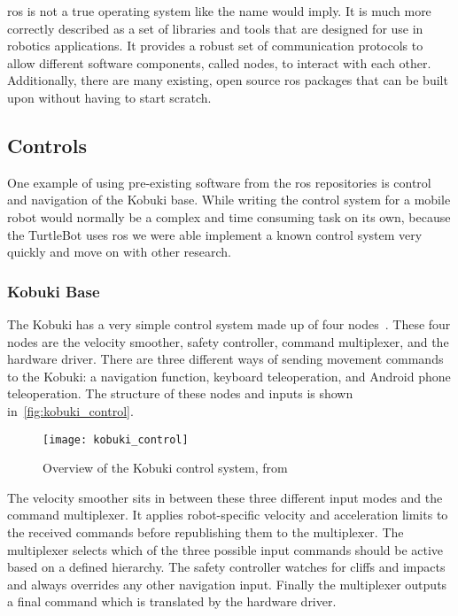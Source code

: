 \documentclass[thesis.tex]{subfile}
\begin{document}
\gls{ros} is not a true operating system like the name would imply. It is much more correctly described as a set of libraries and tools that are designed for use in robotics applications. It provides a robust set of communication protocols to allow different software components, called \glspl{node}, to interact with each other. Additionally, there are many existing, open source \gls{ros} packages that can be built upon without having to start scratch.

\subsection{Controls} \label{sec:controls}
One example of using pre-existing software from the \gls{ros} repositories is control and navigation of the Kobuki base. While writing the control system for a mobile robot would normally be a complex and time consuming task on its own, because the TurtleBot uses \gls{ros} we were able implement a known control system very quickly and move on with other research.

\subsubsection{Kobuki Base}
The Kobuki has a very simple control system made up of four \glspl{node}~\cite{KobukiControl}. These four \glspl{node} are the velocity smoother, safety controller, command multiplexer, and the hardware driver. There are three different ways of sending movement commands to the Kobuki: a navigation function, keyboard teleoperation, and Android phone teleoperation. The structure of these nodes and inputs is shown in~\autoref{fig:kobuki_control}.

\begin{figure}
\texttt{[image: kobuki\_control]}
\caption[Overview of the Kobuki control system]{Overview of the Kobuki control system, from~\cite{KobukiControl}}
\label{fig:kobuki_control}
\end{figure}

The velocity smoother sits in between these three different input modes and the command multiplexer. It applies robot-specific velocity and acceleration limits to the received commands before republishing them to the multiplexer. The multiplexer selects which of the three possible input commands should be active based on a defined hierarchy. The safety controller watches for cliffs and impacts and always overrides any other navigation input. Finally the multiplexer outputs a final command which is translated by the hardware driver.
 
\end{document}
